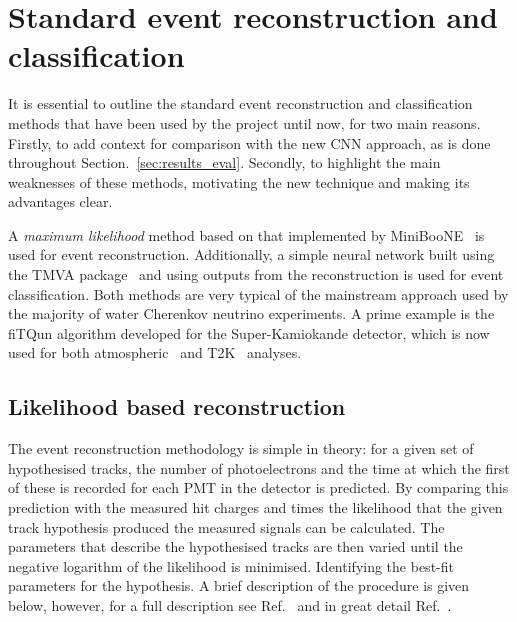 \section{Standard event reconstruction and classification} %
\label{sec:cnn_old} %

It is essential to outline the standard event reconstruction and classification methods that have
been used by the \chips project until now, for two main reasons. Firstly, to add context for
comparison with the new CNN approach, as is done throughout Section.~\ref{sec:results_eval}.
Secondly, to highlight the main weaknesses of these methods, motivating the new technique and
making its advantages clear.

A \emph{maximum likelihood} method based on that implemented by MiniBooNE~\cite{patterson2009} is
used for event reconstruction. Additionally, a simple neural network built using the TMVA
package~\cite{hocker2007} and using outputs from the reconstruction is used for event
classification. Both methods are very typical of the mainstream approach used by the majority of
water Cherenkov neutrino experiments. A prime example is the fiTQun algorithm developed for the
Super-Kamiokande detector, which is now used for both atmospheric~\cite{jiang2019} and
T2K~\cite{missert2017} analyses.

\subsection{Likelihood based reconstruction} %
\label{sec:cnn_old_reco} %

The event reconstruction methodology is simple in theory: for a given set of hypothesised tracks,
the number of photoelectrons and the time at which the first of these is recorded for each PMT in
the detector is predicted. By comparing this prediction with the measured hit charges and times
the likelihood that the given track hypothesis produced the measured signals can be calculated.
The parameters that describe the hypothesised tracks are then varied until the negative logarithm
of the likelihood is minimised. Identifying the best-fit parameters for the hypothesis. A brief
description of the procedure is given below, however, for a full description see
Ref.~\cite{blake2016} and in great detail Ref.~\cite{perch2017}.

